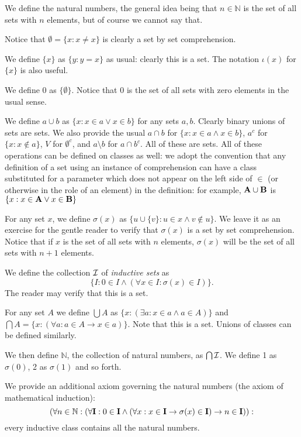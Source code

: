 \documentclass[12pt]{article}
\begin{document}
We define the natural numbers, the general idea being that $n \in \mathbb N$ is the set of all sets with $n$ elements, but of course we cannot say that.

Notice that $\emptyset = \{x : x \neq x\}$ is clearly a set by set comprehension.

We define $\{x\}$ as $\{y : y=x\}$ as usual:  clearly this is a set.  The notation $\iota(x)$ for $\{x\}$ is also useful.

We define 0 as $\{\emptyset\}$.  Notice that 0 is the set of all sets with zero elements in the usual sense.

We define $a \cup b$ as $\{x : x\in a \vee x \in b\}$ for any sets $a,b$.   Clearly binary unions of sets are sets.
We also provide the usual $a \cap b$ for $\{x : x\in a \wedge x \in b\}$, $a^c$ for $\{x : x \not\in a\}$, $V$ for $\emptyset^c$, and $a \setminus b$ for $a \cap b^c$.  All of these are sets.  All of these operations can be defined on classes as well:  we adopt the convention that any definition of a set using an instance of comprehension can have a class substituted for a parameter which does not appear on the left side of $\in$ (or otherwise in the role of an element)  in the definition:  for example, ${\bf A} \cup {\bf B}$ is $\{x : x\in {\bf A} \vee x \in {\bf B}\}$

For any set $x$, we define $\sigma(x)$ as $\{u \cup \{v\}:u \in x \wedge v \not\in u\}$.  We leave it as an exercise for the gentle reader to verify that $\sigma(x)$ is a set by set comprehension.  Notice that if $x$ is the set of all sets with $n$ elements, $\sigma(x)$ will be the set of all sets with $n+1$ elements.

We define the collection $\cal I$ of {\em inductive sets\/} as $$\{I : 0 \in I \wedge (\forall x \in I:\sigma(x) \in I)\}.$$  The reader may verify that this is a set.

For any set $A$ we define $\bigcup A$ as $\{x : (\exists a:x \in a \wedge a \in A)\}$ and $\bigcap A = \{x: (\forall a:a \in A \rightarrow x \in a)\}$.  Note that this is a set.  Unions of classes can be defined similarly.

We then define $\mathbb N$, the collection of natural numbers, as $\bigcap \cal I$.  We define 1 as $\sigma(0)$, 2 as $\sigma(1)$ and so forth.

We provide an additional axiom governing the natural numbers (the axiom of mathematical induction):  $$(\forall n \in \mathbb N:(\forall {\bf I}: 0 \in {\bf I} \wedge (\forall x:x \in {\bf I} \rightarrow \sigma(x) \in {\bf I}) \rightarrow n \in {\bf I})):$$  every inductive class contains all the natural numbers.
\end{document}
